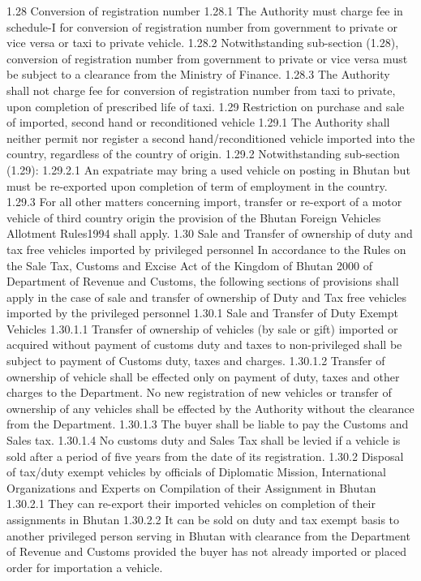 \documentclass[
]{book}
\begin{document}
1.28 Conversion of registration number
1.28.1 The Authority must charge fee in schedule-I for conversion of registration number from government to private or vice versa or taxi to private vehicle.
1.28.2 Notwithstanding sub-section (1.28), conversion of registration number from government to private or vice versa must be subject to a clearance from the Ministry of Finance.
1.28.3 The Authority shall not charge fee for conversion of registration number from taxi to private, upon completion of prescribed life of taxi.
1.29 Restriction on purchase and sale of imported, second hand or reconditioned vehicle
1.29.1 The Authority shall neither permit nor register a second hand/reconditioned vehicle imported into the country, regardless of the country of origin.
1.29.2 Notwithstanding sub-section (1.29):
1.29.2.1 An expatriate may bring a used vehicle on posting in Bhutan but must be re-exported upon completion of term of employment in the country.
1.29.3 For all other matters concerning import, transfer or re-export of a motor vehicle of third country origin the provision of the Bhutan Foreign Vehicles Allotment Rules1994 shall apply.
1.30 Sale and Transfer of ownership of duty and tax free vehicles imported by privileged personnel
In accordance to the Rules on the Sale Tax, Customs and Excise Act of the Kingdom of Bhutan 2000 of Department of Revenue and Customs, the following sections of provisions shall apply in the case of sale and transfer of ownership of Duty and Tax free vehicles imported by the privileged personnel
1.30.1 Sale and Transfer of Duty Exempt Vehicles
1.30.1.1 Transfer of ownership of vehicles (by sale or gift) imported or acquired without payment of customs duty and taxes to non-privileged shall be subject to payment of Customs duty, taxes and charges.
1.30.1.2 Transfer of ownership of vehicle shall be effected only on payment of duty, taxes and other charges to the Department. No new registration of new vehicles or transfer of ownership of any vehicles shall be effected by the Authority without the clearance from the Department.
1.30.1.3 The buyer shall be liable to pay the Customs and Sales tax.
1.30.1.4 No customs duty and Sales Tax shall be levied if a vehicle is sold after a period of five years from the date of its registration.
1.30.2 Disposal of tax/duty exempt vehicles by officials of Diplomatic Mission, International Organizations and Experts on Compilation of their Assignment in Bhutan
1.30.2.1 They can re-export their imported vehicles on completion of their assignments in Bhutan
1.30.2.2 It can be sold on duty and tax exempt basis to another privileged person serving in Bhutan with clearance from the Department of Revenue and Customs provided the buyer has not already imported or placed order for importation a vehicle.
\end{document}

